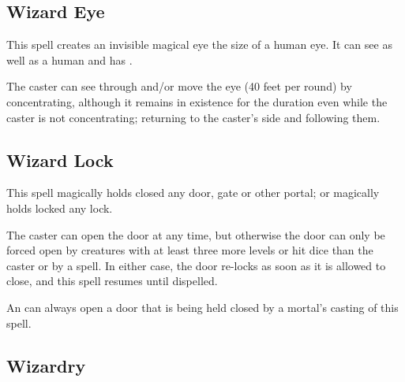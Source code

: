 \begin{multicols*}{2}
\subsection{Wizard Eye}\label{spell:Wizard Eye}

This spell creates an invisible magical eye the size of a human eye. It can see as well as a human and has .

The caster can see through and/or move the eye (40 feet per round) by concentrating, although it remains in existence for the duration even while the caster is not concentrating; returning to the caster’s side and following them.

\subsection{Wizard Lock}\label{spell:Wizard Lock}

This spell magically holds closed any door, gate or other portal; or magically holds locked any lock.

The caster can open the door at any time, but otherwise the door can only be forced open by creatures with at least three more levels or hit dice than the caster or by a  spell. In either case, the door re-locks as soon as it is allowed to close, and this spell resumes until dispelled.

An  can always open a door that is being held closed by a mortal’s casting of this spell.

\subsection{Wizardry}\label{spell:Wizardry}
\end{multicols*}
